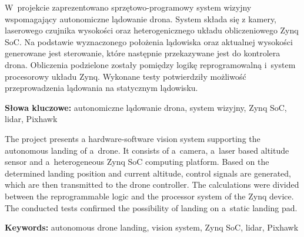 \documentclass[11pt]{aghdpl}
\author{Jakub Kłosiński}
\date{2020}
\newenvironment{abstractpage}
{\cleardoublepage\vspace*{\fill}\thispagestyle{empty}}
{\vfill\cleardoublepage}
\renewenvironment{abstract}[1]
{\bigskip\selectlanguage{#1}%
	\begin{center}\bfseries\abstractname\end{center}}
{\par\bigskip}
\begin{document}
\titlepages


\begin{abstractpage}
	\begin{abstract}{polish}
		W~projekcie zaprezentowano sprzętowo-programowy system wizyjny wspomagający autonomiczne lądowanie drona. 
		System składa się z kamery, laserowego czujnika wysokości oraz heterogenicznego układu obliczeniowego Zynq SoC.
		Na podstawie wyznaczonego położenia lądowiska oraz aktualnej wysokości generowane jest sterowanie, które następnie przekazywane jest do kontrolera drona.
		Obliczenia podzielone zostały pomiędzy logikę reprogramowalną i~system procesorowy układu Zynq. 
		Wykonane testy potwierdziły możliwość przeprowadzenia lądowania na statycznym lądowisku.
		
		\bigskip
		\textbf{Słowa kluczowe:}   autonomiczne lądowanie drona, system wizyjny, Zynq SoC, lidar, Pixhawk
		
		
	\end{abstract}
	\bigskip
	\bigskip
	\bigskip
	\bigskip
	\bigskip
	\bigskip
	\bigskip
	\bigskip
	\bigskip
	\bigskip
	\bigskip
	\begin{abstract}{english}
		The project presents a hardware-software vision system supporting the autonomous landing of a~drone.
		It consists of a~camera, a~laser based altitude sensor and a~heterogeneous Zynq SoC computing platform.
		Based on the determined landing position and current altitude, control signals are generated, which are then transmitted to the drone controller.
		The calculations were divided between the reprogrammable logic and the processor system of the Zynq device.
		The conducted tests confirmed the possibility of landing on a~static landing pad.
		\bigskip
		
		\textbf{Keywords:} autonomous drone landing, vision system, Zynq SoC, lidar, Pixhawk
	\end{abstract}
\end{abstractpage}


{
	\fancyhf{}
	\renewcommand{\headrulewidth}{0pt}
	\renewcommand{\footrulewidth}{0pt}
}

\setcounter{tocdepth}{2}
\tableofcontents
\clearpage







%
%
%
%
%
\end{document}
